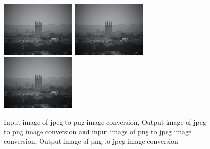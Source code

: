\documentclass{article}
\begin{document}
{    \begin{figure}[htp]
        \begin{overprint}
            \includegraphics[width=0.33\textwidth]{Assignment-13/tower.jpg}
            \includegraphics[width=0.33\textwidth]{Assignment-13/tower.png}
            \includegraphics[width=0.33\textwidth]{Assignment-13/tower2.jpeg}
        \end{overprint}
        \caption{Input image of jpeg to png image conversion, Output image of jpeg to png image conversion and input image of png to jpeg image conversion, Output image of png to jpeg image conversion}
    \end{figure}
}
\clearpage
\end{document}
